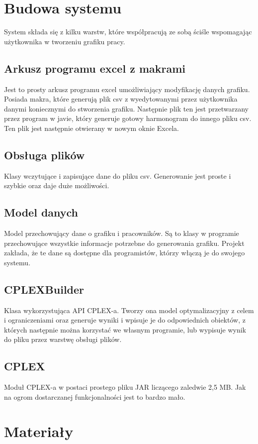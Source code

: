 \documentclass{article}
\begin{document}
\section{Budowa systemu}

System składa się z kilku warstw, które współpracują ze sobą ściśle wspomagając użytkownika w tworzeniu grafiku pracy. 
\subsection{Arkusz programu excel z makrami}
Jest to prosty arkusz programu excel umożliwiający modyfikację danych grafiku. Posiada makra, które generują plik csv z wyedytowanymi przez użytkownika danymi koniecznymi do stworzenia grafiku. Następnie plik ten jest przetwarzany przez program w javie, który generuje gotowy harmonogram do innego pliku csv. Ten plik jest następnie otwierany w nowym oknie Excela. 

\subsection{Obsługa plików}
Klasy wczytujące i zapisujące dane do pliku csv. Generowanie jest proste i szybkie oraz daje duże możliwości. 

\subsection{Model danych}
Model przechowujący dane o grafiku i pracowników. Są to klasy w programie przechowujące wszystkie informacje potrzebne do generowania grafiku. Projekt zakłada, że te dane są dostępne dla programistów, którzy włączą je do swojego systemu.  

\subsection{CPLEXBuilder}
Klasa wykorzystująca API CPLEX-a. Tworzy ona model optymalizacyjny z celem i ograniczeniami oraz generuje wyniki i wpisuje je do odpowiednich obiektów, z których następnie można korzystać we własnym programie, lub wypisuje wynik do pliku przez warstwę obsługi plików. 

\subsection{CPLEX}
Moduł CPLEX-a w postaci prostego pliku JAR liczącego zaledwie 2,5 MB. Jak na ogrom dostarczanej funkcjonalności jest to bardzo mało. 
\section{Materiały}
\end{document}
